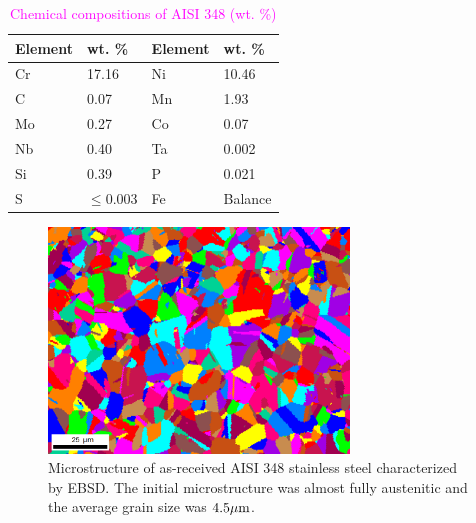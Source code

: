 \documentclass[preprint,5p,twocolumn,10pt,sort&compress]{elsarticle}
\newcommand{\jingyu}[1]{\textcolor{magenta}{#1}}
\begin{document}
\begin{table}[!ht]
  \centering
  \caption{\jingyu{Chemical compositions of AISI 348 (wt. \%)}}
    \begin{tabular}{llll}
    \toprule
    Element & wt. \% & Element & wt. \% \\
    \midrule
    Cr    & 17.16  & Ni    & 10.46 \\
    C     & 0.07   & Mn    & 1.93 \\
    Mo    & 0.27   & Co    & 0.07 \\
    Nb    & 0.40   & Ta    & 0.002 \\
    Si    & 0.39   & P     & 0.021 \\
    S     & $\leq$0.003    & Fe     & Balance \\
    \bottomrule
    \end{tabular}%
  \label{Tab:ChemicalComposition}
\end{table}

\begin{figure}[!htp]
  \begin{center}
  \includegraphics[width=8cm]{BMmicrostructure.png}
  \caption{Microstructure of as-received AISI 348 stainless steel characterized by EBSD. The initial microstructure was almost fully austenitic and the average grain size was $4.5 \rm{\mu m}$.}
  \label{fig:BMmicrostructure}
  \end{center}
\end{figure}

\end{document}
